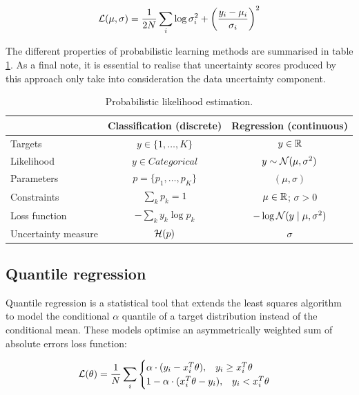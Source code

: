 $$\mathcal{L}(\mu, \sigma)  = \frac{1}{2N} \sum_i \log \sigma_i^2 + \left ( \frac{y_i - \mu_i}{\sigma_i}\right)^2$$
 
The different properties of probabilistic learning methods are summarised in table \ref{table:probabilistic-learning}. As a final note, it is essential to realise that uncertainty scores produced by this approach only take into consideration the data uncertainty component. 




\begin{table}[ht]
\centering
\caption{Probabilistic likelihood estimation.}
\label{table:probabilistic-learning}
\begin{tabular}[t]{lcc} %
\hline
&Classification (discrete) & Regression (continuous)\\
\hline
Targets     & $y \in \{1,\ldots, K\}$   & $y \in \operatorname{\mathbb{R}}$  \\
Likelihood  & $y \in Categorical$       & $y \sim \mathcal{N}(\mu, \sigma^2)$\\
Parameters  & $p=\{p_1, \ldots, p_K\}$    & $(\mu, \sigma)$\\ 
Constraints  & $\sum_k p_k = 1$          & $\mu \in \operatorname{\mathbb{R}}$; $\sigma > 0$\\
Loss function & $-\sum_k y_k \log p_k$  & $ - \log  \mathcal{N}(y \mid \mu, \sigma^2)$\\
Uncertainty measure & $\operatorname{\mathcal{H}}(p)$ & $\sigma$ \\
\hline
\end{tabular}
\end{table}%




\subsection{Quantile regression} \label{model:quantile-regression}

Quantile regression\cite{quantileRegression} is a statistical tool that extends the least squares algorithm to model the conditional $\alpha$ quantile of a target distribution instead of the conditional mean. %
These models optimise an asymmetrically weighted sum of absolute errors loss function:

$$
\mathcal{L}(\theta) =\frac{1}{N} \sum_i 
\begin{cases}
    \alpha \cdot (y_i - x_i^T  \theta), \;\;\; y_i \geq x_i^T  \theta \\
    1-\alpha \cdot (x_i^T  \theta - y_i),\;\;\; y_i < x_i^T  \theta \\
\end{cases}
$$

